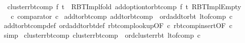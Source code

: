 \begin{isabellebody}
\ \ {\isachardoublequoteopen}cluster{\isacharunderscore}{\kern0pt}rbt{\isacharunderscore}{\kern0pt}comp\ f\ t\ {\isacharequal}{\kern0pt}\ RBT{\isacharunderscore}{\kern0pt}Impl{\isachardot}{\kern0pt}fold\ {\isacharparenleft}{\kern0pt}add{\isacharunderscore}{\kern0pt}option{\isacharunderscore}{\kern0pt}to{\isacharunderscore}{\kern0pt}rbt{\isacharunderscore}{\kern0pt}comp\ f{\isacharparenright}{\kern0pt}\ t\ RBT{\isacharunderscore}{\kern0pt}Impl{\isachardot}{\kern0pt}Empty{\isachardoublequoteclose}\isanewline
\isanewline
{}\isamarkupfalse%
\isanewline
\ \ \ c{\isacharcolon}{\kern0pt}\ {\isachardoublequoteopen}comparator\ c{\isachardoublequoteclose}\isanewline
{}\isanewline
\isanewline
{}\isamarkupfalse%
\ add{\isacharunderscore}{\kern0pt}to{\isacharunderscore}{\kern0pt}rbt{\isacharunderscore}{\kern0pt}comp{\isacharcolon}{\kern0pt}\ {\isachardoublequoteopen}add{\isacharunderscore}{\kern0pt}to{\isacharunderscore}{\kern0pt}rbt{\isacharunderscore}{\kern0pt}comp\ {\isacharequal}{\kern0pt}\ ord{\isachardot}{\kern0pt}add{\isacharunderscore}{\kern0pt}to{\isacharunderscore}{\kern0pt}rbt\ {\isacharparenleft}{\kern0pt}lt{\isacharunderscore}{\kern0pt}of{\isacharunderscore}{\kern0pt}comp\ c{\isacharparenright}{\kern0pt}{\isachardoublequoteclose}\isanewline
%
\isadelimproof
\ \ %
\endisadelimproof
%
\isatagproof
{}\isamarkupfalse%
\ add{\isacharunderscore}{\kern0pt}to{\isacharunderscore}{\kern0pt}rbt{\isacharunderscore}{\kern0pt}comp{\isacharunderscore}{\kern0pt}def\ ord{\isachardot}{\kern0pt}add{\isacharunderscore}{\kern0pt}to{\isacharunderscore}{\kern0pt}rbt{\isacharunderscore}{\kern0pt}def\ rbt{\isacharunderscore}{\kern0pt}comp{\isacharunderscore}{\kern0pt}lookup{\isacharbrackleft}{\kern0pt}OF\ c{\isacharbrackright}{\kern0pt}\ rbt{\isacharunderscore}{\kern0pt}comp{\isacharunderscore}{\kern0pt}insert{\isacharbrackleft}{\kern0pt}OF\ c{\isacharbrackright}{\kern0pt}\isanewline
\ \ \isamarkupfalse%
\ simp%
\endisatagproof
{\isafoldproof}%
%
\isadelimproof
\isanewline
%
\endisadelimproof
\isanewline
{}\isamarkupfalse%
\ cluster{\isacharunderscore}{\kern0pt}rbt{\isacharunderscore}{\kern0pt}comp{\isacharcolon}{\kern0pt}\ {\isachardoublequoteopen}cluster{\isacharunderscore}{\kern0pt}rbt{\isacharunderscore}{\kern0pt}comp\ {\isacharequal}{\kern0pt}\ ord{\isachardot}{\kern0pt}cluster{\isacharunderscore}{\kern0pt}rbt\ {\isacharparenleft}{\kern0pt}lt{\isacharunderscore}{\kern0pt}of{\isacharunderscore}{\kern0pt}comp\ c{\isacharparenright}{\kern0pt}{\isachardoublequoteclose}\isanewline

\end{isabellebody}
